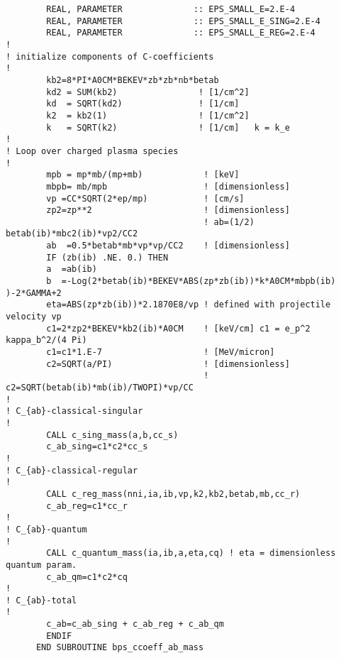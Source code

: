 \documentclass[preprint,12pt,eqsecnum,nofootinbib,amsmath,amssymb]{revtex4}
\begin{document}
{\begin{verbatim}
        REAL, PARAMETER              :: EPS_SMALL_E=2.E-4
        REAL, PARAMETER              :: EPS_SMALL_E_SING=2.E-4
        REAL, PARAMETER              :: EPS_SMALL_E_REG=2.E-4
!
! initialize components of C-coefficients
!
        kb2=8*PI*A0CM*BEKEV*zb*zb*nb*betab
        kd2 = SUM(kb2)                ! [1/cm^2]
        kd  = SQRT(kd2)               ! [1/cm]
        k2  = kb2(1)                  ! [1/cm^2]
        k   = SQRT(k2)                ! [1/cm]   k = k_e
!
! Loop over charged plasma species
!
        mpb = mp*mb/(mp+mb)            ! [keV]
        mbpb= mb/mpb                   ! [dimensionless]
        vp =CC*SQRT(2*ep/mp)           ! [cm/s]
        zp2=zp**2                      ! [dimensionless]
                                       ! ab=(1/2) betab(ib)*mbc2(ib)*vp2/CC2
        ab  =0.5*betab*mb*vp*vp/CC2    ! [dimensionless] 
        IF (zb(ib) .NE. 0.) THEN
        a  =ab(ib)
        b  =-Log(2*betab(ib)*BEKEV*ABS(zp*zb(ib))*k*A0CM*mbpb(ib) )-2*GAMMA+2
        eta=ABS(zp*zb(ib))*2.1870E8/vp ! defined with projectile velocity vp
        c1=2*zp2*BEKEV*kb2(ib)*A0CM    ! [keV/cm] c1 = e_p^2 kappa_b^2/(4 Pi)
        c1=c1*1.E-7                    ! [MeV/micron]  
        c2=SQRT(a/PI)                  ! [dimensionless] 
                                       ! c2=SQRT(betab(ib)*mb(ib)/TWOPI)*vp/CC 
!
! C_{ab}-classical-singular 
!
        CALL c_sing_mass(a,b,cc_s) 
        c_ab_sing=c1*c2*cc_s
!
! C_{ab}-classical-regular 
!
        CALL c_reg_mass(nni,ia,ib,vp,k2,kb2,betab,mb,cc_r)
        c_ab_reg=c1*cc_r
!
! C_{ab}-quantum
!
        CALL c_quantum_mass(ia,ib,a,eta,cq) ! eta = dimensionless quantum param.
        c_ab_qm=c1*c2*cq
!
! C_{ab}-total
!
        c_ab=c_ab_sing + c_ab_reg + c_ab_qm
        ENDIF
      END SUBROUTINE bps_ccoeff_ab_mass
\end{verbatim}
}
\end{document}
